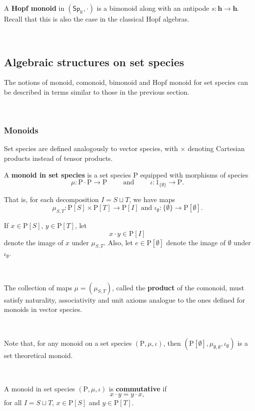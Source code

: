 \documentclass[12pt, reqno]{amsart}
\theoremstyle{definition}
\newcommand{\Ssk}{\mathsf{Sp}_\Kb} %
\newcommand{\Kb}{\mathbb{K}}
\newcommand{\rP}{\mathrm{P}}
\newcommand{\thh}{\mathbf{h}}
\begin{document}
A {\bf Hopf monoid} in $(\Ssk, \cdot)$ is a bimonoid along with an antipode $s:\thh \to \thh $.
Recall that this is also the case in the classical Hopf algebras.

\

\subsection{Algebraic structures on set species}

The notions of monoid, comonoid, bimonoid and Hopf monoid for set species can be described in terms similar to those in the previous section. 

\

\subsubsection{Monoids}

Set species are defined analogously to vector species, with $\times$ denoting Cartesian products instead of tensor products.

A {\bf monoid in set species} is a set species $\rP$ equipped with morphisms of species
\begin{equation}
    \mu: \rP \cdot \rP \to \rP \qquad \text{ and } \qquad \iota: \mathrm{1}_{\{\emptyset \} } \to \rP.
\end{equation}

That is, for each decomposition $I=S \sqcup T$, we have maps 
\begin{equation}
    \mu_{S,T}: \rP[S] \times \rP[T]\to \rP[I] \text{ and } \iota_\emptyset: \{\emptyset\} \to \rP[\emptyset].
\end{equation}

If $x \in \rP[S]$, $y \in \rP[T]$,  let 
\[x \cdot y \in \rP[I]\]
denote the image of $x$ under $\mu_{S,T}$. Also, let $e\in \rP[\emptyset]$ denote the image of $\emptyset$ under $\iota_\emptyset$.

\

The collection of maps $\mu=(\mu_{S,T})$, called the {\bf product} of the comonoid, must satisfy naturality, associativity and unit axioms analogue to the ones defined for monoids in vector species.

\

Note that, for any monoid on a set species $(\rP, \mu, \iota)$, then $(\rP[\emptyset], \mu_{\emptyset, \emptyset}, \iota_\emptyset)$ is a set theoretical monoid.

\

A monoid in set species $(\rP, \mu, \iota)$ is {\bf commutative} if
\[x\cdot y=y\cdot x,\]
for all $I=S \sqcup T$, $x \in \rP[S]$ and $y \in \rP[T]$.
\end{document}
